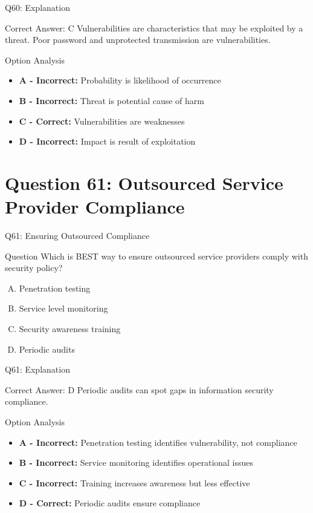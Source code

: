 \documentclass{beamer}
\begin{document}
	\begin{frame}{Q60: Explanation}
		\begin{block}{Correct Answer: C}
			Vulnerabilities are characteristics that may be exploited by a threat. Poor password and unprotected transmission are vulnerabilities.
		\end{block}
		\begin{block}{Option Analysis}
			\begin{itemize}
				\item \textbf{A - Incorrect:} Probability is likelihood of occurrence
				\item \textbf{B - Incorrect:} Threat is potential cause of harm
				\item \textbf{C - Correct:} Vulnerabilities are weaknesses
				\item \textbf{D - Incorrect:} Impact is result of exploitation
			\end{itemize}
		\end{block}
	\end{frame}
	
	
	
	
	
	\section{Question 61: Outsourced Service Provider Compliance}
	
	\begin{frame}{Q61: Ensuring Outsourced Compliance}
		\begin{block}{Question}
			Which is BEST way to ensure outsourced service providers comply with security policy?
		\end{block}
		\begin{enumerate}[(A)]
			\item Penetration testing
			\item Service level monitoring
			\item Security awareness training
			\item Periodic audits
		\end{enumerate}
	\end{frame}
	
	\begin{frame}{Q61: Explanation}
		\begin{block}{Correct Answer: D}
			Periodic audits can spot gaps in information security compliance.
		\end{block}
		\begin{block}{Option Analysis}
			\begin{itemize}
				\item \textbf{A - Incorrect:} Penetration testing identifies vulnerability, not compliance
				\item \textbf{B - Incorrect:} Service monitoring identifies operational issues
				\item \textbf{C - Incorrect:} Training increases awareness but less effective
				\item \textbf{D - Correct:} Periodic audits ensure compliance
			\end{itemize}
		\end{block}
	\end{frame}
	
\end{document}
